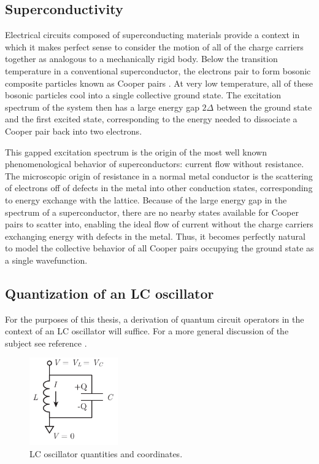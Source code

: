 \subsection{Superconductivity}

Electrical circuits composed of superconducting materials provide a context in which it makes perfect sense to consider the motion of all of the charge carriers together as analogous to a mechanically rigid body.  Below the transition temperature in a conventional superconductor, the electrons pair to form bosonic composite particles known as Cooper pairs \cite{tinkham2004introduction}.  At very low temperature, all of these bosonic particles cool into a single collective ground state.  The excitation spectrum of the system then has a large energy gap $2 \Delta$ between the ground state and the first excited state, corresponding to the energy needed to dissociate a Cooper pair back into two electrons.

This gapped excitation spectrum is the origin of the most well known phenomenological behavior of superconductors: current flow without resistance.  The microscopic origin of resistance in a normal metal conductor is the scattering of electrons off of defects in the metal into other conduction states, corresponding to energy exchange with the lattice.  Because of the large energy gap in the spectrum of a superconductor, there are no nearby states available for Cooper pairs to scatter into, enabling the ideal flow of current without the charge carriers exchanging energy with defects in the metal.  Thus, it becomes perfectly natural to model the collective behavior of all Cooper pairs occupying the ground state as a single wavefunction.

\subsection{Quantization of an LC oscillator}

For the purposes of this thesis, a derivation of quantum circuit operators in the context of an LC oscillator will suffice.  For a more general discussion of the subject see reference \cite{Devoret1995}.

\begin{figure}
\begin{center}
	\includegraphics[width = 1.5in]{scqb_chapter/LC_osc}
\end{center}
\caption[LC oscillator circuit diagram]{LC oscillator quantities and coordinates.}
\label{fig:LC_osc}
\end{figure}


